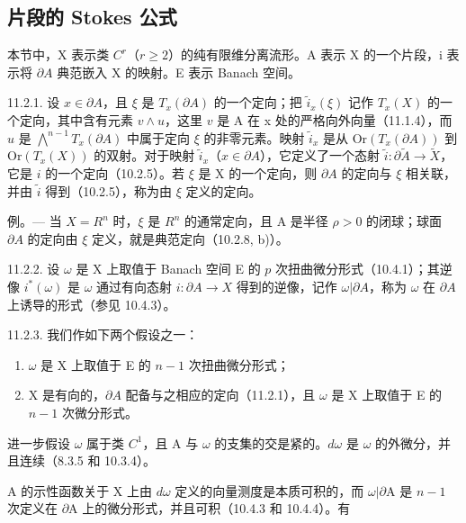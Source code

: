 \subsection{片段的 Stokes 公式}

本节中，X 表示类 \(C^{r}\)（\(r \geqslant 2\)）的纯有限维分离流形。A 表示 X 的一个片段，i 表示将 \(\partial A\) 典范嵌入 X 的映射。E 表示 Banach 空间。

11.2.1. 设 \(x \in \partial A\)，且 \(\xi\) 是 \(T_x(\partial A)\) 的一个定向；把 \(\tilde{i}_x(\xi)\) 记作 \(T_x(X)\) 的一个定向，其中含有元素 \(v \wedge u\)，这里 \(v\) 是 A 在 x 处的严格向外向量（11.1.4），而 \(u\) 是 \(\bigwedge^{n-1} T_x(\partial A)\) 中属于定向 \(\xi\) 的非零元素。映射 \(\tilde{i}_x\) 是从 \(\text{Or}(T_x(\partial A))\) 到 \(\text{Or}(T_x(X))\) 的双射。对于映射 \(\tilde{i}_x\)（\(x \in \partial A\)），它定义了一个态射 \(\tilde{i} \colon \partial \widetilde{A} \to \widetilde{X}\)，它是 \(i\) 的一个定向（10.2.5）。若 \(\xi\) 是 X 的一个定向，则 \(\partial A\) 的定向与 \(\xi\) 相关联，并由 \(\tilde{i}\) 得到（10.2.5），称为由 \(\xi\) 定义的定向。

例。--- 当 \(X = R^{n}\) 时，\(\xi\) 是 \(R^{n}\) 的通常定向，且 A 是半径 \(\rho>0\) 的闭球；球面 \(\partial A\) 的定向由 \(\xi\) 定义，就是典范定向（10.2.8, b)）。

11.2.2. 设 \(\omega\) 是 X 上取值于 Banach 空间 E 的 \(p\) 次扭曲微分形式（10.4.1）；其逆像 \(i^{*}(\omega)\) 是 \(\omega\) 通过有向态射 \(i\colon\partial A\to X\) 得到的逆像，记作 \(\omega|\partial A\)，称为 \(\omega\) 在 \(\partial A\) 上诱导的形式（参见 10.4.3）。

11.2.3. 我们作如下两个假设之一：

\begin{enumerate}
\def\labelenumi{(\roman{enumi})}
\tightlist
\item
  \(\omega\) 是 X 上取值于 E 的 \(n - 1\) 次扭曲微分形式；
\item
  X 是有向的，\(\partial A\) 配备与之相应的定向（11.2.1），且 \(\omega\) 是 X 上取值于 E 的 \(n - 1\) 次微分形式。
\end{enumerate}

进一步假设 \(\omega\) 属于类 \(C^{1}\)，且 A 与 \(\omega\) 的支集的交是紧的。\(d\omega\) 是 \(\omega\) 的外微分，并且连续（8.3.5 和 10.3.4）。

A 的示性函数关于 X 上由 \(d\omega\) 定义的向量测度是本质可积的，而 \(\omega|\partial\mathrm{A}\) 是 \(n-1\) 次定义在 \(\partial\mathrm{A}\) 上的微分形式，并且可积（10.4.3 和 10.4.4）。有

